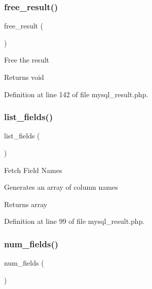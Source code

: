 \subsubsection{\texorpdfstring{free\_result()}{free\_result()}}
{\footnotesize\ttfamily free\+\_\+result (\begin{DoxyParamCaption}{ }\end{DoxyParamCaption})}

Free the result

\begin{DoxyReturn}{Returns}
void 
\end{DoxyReturn}


Definition at line 142 of file mysql\+\_\+result.\+php.

\mbox{\label{class_c_i___d_b__mysql__result_a50b54eb4ea7cfd039740f532988ea776}} 
\subsubsection{\texorpdfstring{list\_fields()}{list\_fields()}}
{\footnotesize\ttfamily list\+\_\+fields (\begin{DoxyParamCaption}{ }\end{DoxyParamCaption})}

Fetch Field Names

Generates an array of column names

\begin{DoxyReturn}{Returns}
array 
\end{DoxyReturn}


Definition at line 99 of file mysql\+\_\+result.\+php.

\mbox{\label{class_c_i___d_b__mysql__result_af831bf363e4d7d661a717a4932af449d}} 
\subsubsection{\texorpdfstring{num\_fields()}{num\_fields()}}
{\footnotesize\ttfamily num\+\_\+fields (\begin{DoxyParamCaption}{ }\end{DoxyParamCaption})}

